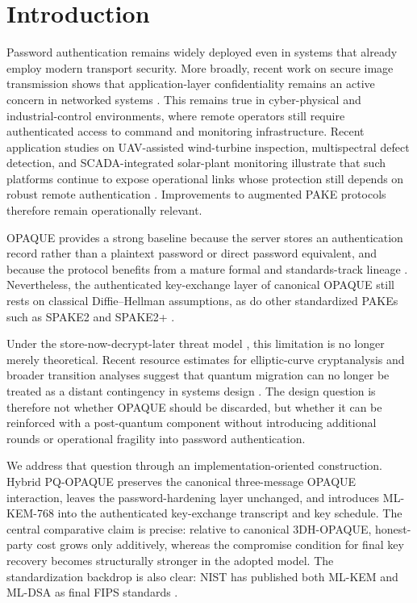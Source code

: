 \documentclass[conference]{IEEEtran}
\begin{document}
\section{Introduction}

Password authentication remains widely deployed even in systems that already employ modern transport security. More broadly, recent work on secure image transmission shows that application-layer confidentiality remains an active concern in networked systems \cite{shibeeb2023}. This remains true in cyber-physical and industrial-control environments, where remote operators still require authenticated access to command and monitoring infrastructure. Recent application studies on UAV-assisted wind-turbine inspection, multispectral defect detection, and SCADA-integrated solar-plant monitoring illustrate that such platforms continue to expose operational links whose protection still depends on robust remote authentication \cite{en18071823,Svystun_Melnychenko_Radiuk_Savenko_Sachenko_Lysyi_2024,reksreks.2025.2.06}. Improvements to augmented PAKE protocols therefore remain operationally relevant.

OPAQUE provides a strong baseline because the server stores an authentication record rather than a plaintext password or direct password equivalent, and because the protocol benefits from a mature formal and standards-track lineage \cite{jarecki2018,ietf-opaque}. Nevertheless, the authenticated key-exchange layer of canonical OPAQUE still rests on classical Diffie--Hellman assumptions, as do other standardized PAKEs such as SPAKE2 and SPAKE2+ \cite{ladd2023,spake2plus2023}.

Under the store-now-decrypt-later threat model \cite{mosca2018}, this limitation is no longer merely theoretical. Recent resource estimates for elliptic-curve cryptanalysis and broader transition analyses suggest that quantum migration can no longer be treated as a distant contingency in systems design \cite{shor1994,bernstein2017,roetteler2017,babbush2026}. The design question is therefore not whether OPAQUE should be discarded, but whether it can be reinforced with a post-quantum component without introducing additional rounds or operational fragility into password authentication.

We address that question through an implementation-oriented construction. Hybrid PQ-OPAQUE preserves the canonical three-message OPAQUE interaction, leaves the password-hardening layer unchanged, and introduces ML-KEM-768 into the authenticated key-exchange transcript and key schedule. The central comparative claim is precise: relative to canonical 3DH-OPAQUE, honest-party cost grows only additively, whereas the compromise condition for final key recovery becomes structurally stronger in the adopted model. The standardization backdrop is also clear: NIST has published both ML-KEM and ML-DSA as final FIPS standards \cite{fips203,fips204}.
\end{document}
